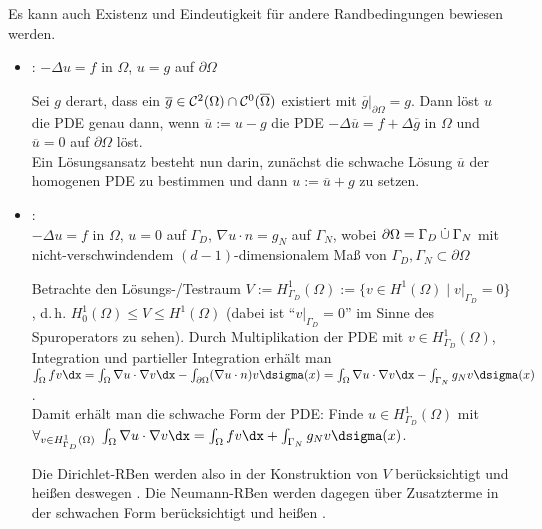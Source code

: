 \begin{Bem}
    Es kann auch Existenz und Eindeutigkeit für andere Randbedingungen bewiesen werden.
    \begin{itemize}
        \item
        :
        $-\Delta u = f$ in $\Omega$, $u = g$ auf $\partial\Omega$
        
        Sei $g$ derart, dass ein $\overline{g} \in \mathcal{C}^2(\Omega) \cap \mathcal{C}^0(\overline{\Omega})$
        existiert mit $\overline{g}|_{\partial\Omega} = g$.
        Dann löst $u$ die PDE genau dann, wenn $\overline{u} := u - g$ die PDE
        $-\Delta \overline{u} = f + \Delta\overline{g}$ in $\Omega$ und
        $\overline{u} = 0$ auf $\partial\Omega$ löst.\\
        Ein Lösungsansatz besteht nun darin, zunächst die schwache Lösung
        $\overline{u}$ der homogenen PDE zu bestimmen und dann
        $u := \overline{u} + g$ zu setzen.
        
        \item
        :\\
        $-\Delta u = f$ in $\Omega$, $u = 0$ auf $\Gamma_D$,
        $\nabla u \cdot n = g_N$ auf $\Gamma_N$, wobei
        $\partial\Omega = \Gamma_D \mathbin{\dot{\cup}} \Gamma_N$ mit
        nicht-verschwindendem $(d-1)$-dimensionalem Maß von
        $\Gamma_D, \Gamma_N \subset \partial\Omega$
        
        Betrachte den Lösungs-/Testraum
        $V := H^1_{\Gamma_D}(\Omega) := \{v \in H^1(\Omega) \;|\; v|_{\Gamma_D} = 0\}$,
        d.\,h. $H^1_0(\Omega) \le V \le H^1(\Omega)$
        (dabei ist "`$v|_{\Gamma_D} = 0$"' im Sinne des Spuroperators zu sehen).
        Durch Multiplikation der PDE mit $v \in H^1_{\Gamma_D}(\Omega)$,
        Integration und partieller Integration erhält man
        $\int_\Omega fv \dx = \int_\Omega \nabla u \cdot \nabla v \dx -
        \int_{\partial\Omega} (\nabla u \cdot n) v \dsigma(x) =
        \int_\Omega \nabla u \cdot \nabla v \dx -
        \int_{\Gamma_N} g_N v \dsigma(x)$.\\
        Damit erhält man die schwache Form der PDE:
        Finde $u \in H^1_{\Gamma_D}(\Omega)$ mit\\
        $\forall_{v \in H^1_{\Gamma_D}(\Omega)}\;
        \int_\Omega \nabla u \cdot \nabla v \dx
        = \int_\Omega fv \dx + \int_{\Gamma_N} g_N v \dsigma(x)$.
        
        Die Dirichlet-RBen werden also in der Konstruktion von $V$ berücksichtigt und
        heißen deswegen .
        Die Neumann-RBen werden dagegen über Zusatzterme in der schwachen Form berücksichtigt und
        heißen .
    \end{itemize}
\end{Bem}

